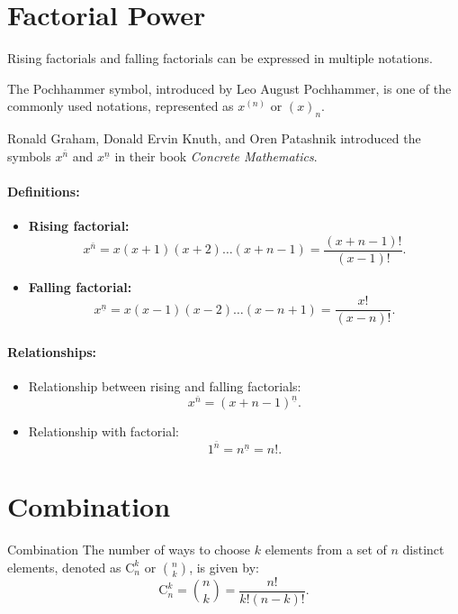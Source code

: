\documentclass[11pt]{../../TexTemplate/elegantbook}
\begin{document}
\section{Factorial Power}
\begin{definition}
    Rising factorials and falling factorials can be expressed in multiple notations.

    The Pochhammer symbol, introduced by Leo August Pochhammer, is one of the commonly used notations, 
    represented as \( x^{(n)} \) or \( (x)_n \).

    Ronald Graham, Donald Ervin Knuth, and Oren Patashnik introduced the symbols 
    \( x^{\bar{n}} \) and \( x^{\underline{n}} \) in their book \textit{Concrete Mathematics}.

    \paragraph{Definitions:}
    \begin{itemize}
        \item \textbf{Rising factorial:}
        \[
        x^{\bar{n}} = x(x+1)(x+2)\dots(x+n-1) = \frac{(x+n-1)!}{(x-1)!}.
        \]
        \item \textbf{Falling factorial:}
        \[
        x^{\underline{n}} = x(x-1)(x-2)\dots(x-n+1) = \frac{x!}{(x-n)!}.
        \]
    \end{itemize}

    \paragraph{Relationships:}
    \begin{itemize}
        \item Relationship between rising and falling factorials:
        \[
        x^{\bar{n}} = (x+n-1)^{\underline{n}}.
        \]
        \item Relationship with factorial:
        \[
        1^{\bar{n}} = n^{\underline{n}} = n!.
        \]
    \end{itemize}
\end{definition}

\section{Combination}
\begin{definition}{Combination}
    The number of ways to choose \(k\) elements from a set of \(n\) distinct elements, 
    denoted as \(\mathrm{C}_{n}^{k}\) or \(\binom{n}{k}\), is given by:
    \[
        \mathrm{C}_{n}^{k} = \binom{n}{k} = \frac{n!}{k!(n-k)!}.
    \]
\end{definition}
\end{document}

